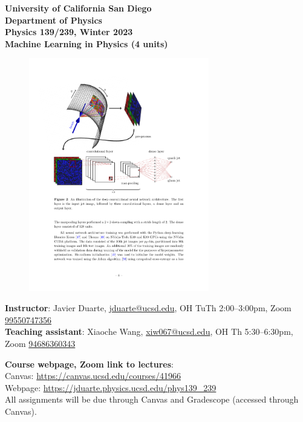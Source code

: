 \documentclass[12pt]{article}
\begin{document}
\begin{center}
	\textbf{University of California San Diego\\
		Department of Physics\\
		Physics 139/239, Winter 2023\\
		Machine Learning in Physics (4 units)}
\end{center}

\begin{figure}[h!]
	\centering
	\includegraphics[width=0.7\textwidth]{quark_gluon.pdf}
\end{figure}

\noindent\textbf{Instructor}: Javier Duarte, \href{mailto:jduarte@ucsd.edu}{jduarte@ucsd.edu}, OH TuTh 2:00--3:00pm, Zoom \href{https://ucsd.zoom.us/j/99550747356}{99550747356}\\
\noindent \textbf{Teaching assistant}: Xiaoche Wang, \href{mailto:xiw067@ucsd.edu}{xiw067@ucsd.edu}, OH Th 5:30--6:30pm, Zoom \href{https://ucsd.zoom.us/j/94686360343}{94686360343}

\noindent\textbf{Course webpage, Zoom link to lectures}:\\
\hspace*{1cm}Canvas: \href{https://canvas.ucsd.edu/courses/41966}{https://canvas.ucsd.edu/courses/41966}\\
\hspace*{1cm}Webpage: \href{https://jduarte.physics.ucsd.edu/phys139\_239}{https://jduarte.physics.ucsd.edu/phys139\_239}\\
\hspace*{1cm}All assignments will be due through Canvas and Gradescope (accessed through Canvas).\\
\end{document}
